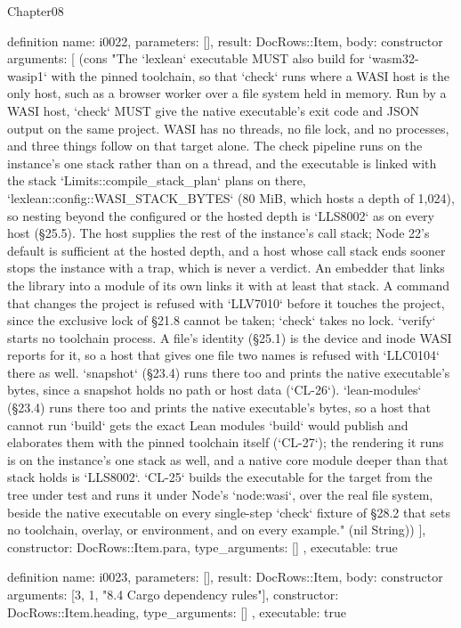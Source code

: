 \begin{lexlean}{Chapter08}
\begin{semanticmodule}
definition{
  name: i0022,
  parameters: [],
  result: DocRows::Item,
  body: constructor{
    arguments: [
      (cons "The `lexlean` executable MUST also build for `wasm32-wasip1` with the pinned toolchain, so that `check` runs where a WASI host is the only host, such as a browser worker over a file system held in memory. Run by a WASI host, `check` MUST give the native executable's exit code and JSON output on the same project. WASI has no threads, no file lock, and no processes, and three things follow on that target alone. The check pipeline runs on the instance's one stack rather than on a thread, and the executable is linked with the stack `Limits::compile_stack_plan` plans on there, `lexlean::config::WASI_STACK_BYTES` (80 MiB, which hosts a depth of 1,024), so nesting beyond the configured or the hosted depth is `LLS8002` as on every host (§25.5). The host supplies the rest of the instance's call stack; Node 22's default is sufficient at the hosted depth, and a host whose call stack ends sooner stops the instance with a trap, which is never a verdict. An embedder that links the library into a module of its own links it with at least that stack. A command that changes the project is refused with `LLV7010` before it touches the project, since the exclusive lock of §21.8 cannot be taken; `check` takes no lock. `verify` starts no toolchain process. A file's identity (§25.1) is the device and inode WASI reports for it, so a host that gives one file two names is refused with `LLC0104` there as well. `snapshot` (§23.4) runs there too and prints the native executable's bytes, since a snapshot holds no path or host data (`CL-26`). `lean-modules` (§23.4) runs there too and prints the native executable's bytes, so a host that cannot run `build` gets the exact Lean modules `build` would publish and elaborates them with the pinned toolchain itself (`CL-27`); the rendering it runs is on the instance's one stack as well, and a native core module deeper than that stack holds is `LLS8002`. `CL-25` builds the executable for the target from the tree under test and runs it under Node's `node:wasi`, over the real file system, beside the native executable on every single-step `check` fixture of §28.2 that sets no toolchain, overlay, or environment, and on every example." (nil String))
    ],
    constructor: DocRows::Item.para,
    type_arguments: []
  },
  executable: true
}

definition{
  name: i0023,
  parameters: [],
  result: DocRows::Item,
  body: constructor{
    arguments: [3, 1, "8.4 Cargo dependency rules"],
    constructor: DocRows::Item.heading,
    type_arguments: []
  },
  executable: true
}


\end{semanticmodule}
\end{lexlean}
